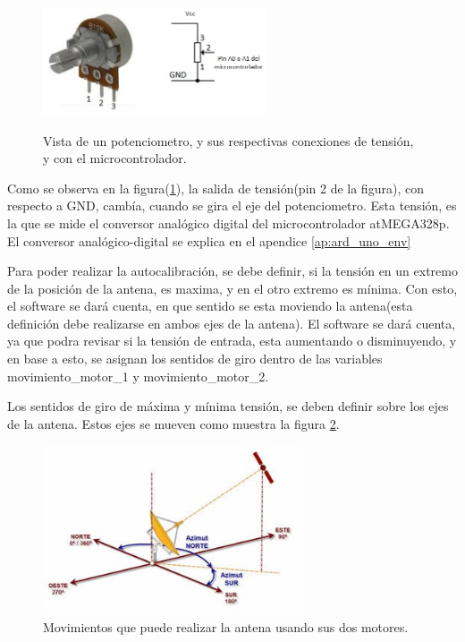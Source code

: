 \begin{figure}
	\centering
	\caption{Vista de un potenciometro, y sus respectivas conexiones de tensión, y con el microcontrolador.}	
	\includegraphics[height=3.2cm]{pote}
	\label{fig:pot}	
\end{figure}
\vspace{30mm}


Como se observa en la figura(\ref{fig:pot}), la salida de tensión(pin 2 de la figura), con respecto a GND, cambía, cuando se gira el eje del potenciometro. Esta tensión, es la que se mide el conversor analógico digital del microcontrolador atMEGA328p. El conversor analógico-digital se explica en el apendice \ref{ap:ard_uno_env}   

Para poder realizar la autocalibración, se debe definir, si la tensión en un extremo de la posición de la antena, es maxima, y en el otro extremo es mínima. Con esto, el software se dará cuenta, en que sentido se esta moviendo la antena(esta definición debe realizarse en ambos ejes de la antena). El software se dará cuenta, ya que podra revisar si la tensión de entrada, esta aumentando o disminuyendo, y en base a esto, se asignan los sentidos de giro dentro de las variables movimiento\_motor\_1 y movimiento\_motor\_2. 

Los sentidos de giro de máxima y mínima tensión, se deben definir sobre los ejes de la antena. Estos ejes se mueven como muestra la figura \ref{fig:mov_antena}. 

\begin{figure}[ht]
	\centering
	\includegraphics[height=5cm]{mov_antena}
	\caption{Movimientos que puede realizar la antena usando sus dos motores.}
	\label{fig:mov_antena}	
\end{figure}


